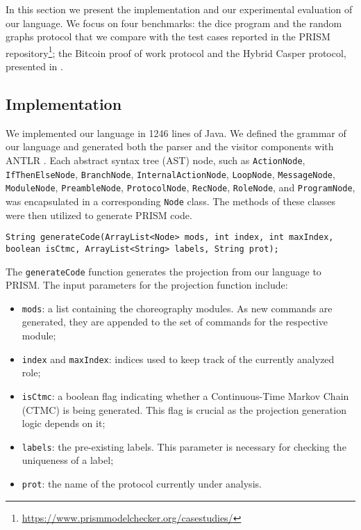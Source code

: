 In this section we present the implementation and our experimental evaluation of our language. 
We focus on four benchmarks: the dice program and the random graphs protocol that we compare with the  
test cases reported in the PRISM repository\footnote{\url{https://www.prismmodelchecker.org/casestudies/}}; 
the Bitcoin proof of work protocol and the Hybrid Casper protocol, 
presented in \cite{DBLP:journals/concurrency/BistarelliNGLMV23,DBLP:journals/distribledger/GallettaLMV23}.
\subsection{Implementation}
We implemented our language in 1246 lines of Java.
We defined the grammar of our language and generated both the parser and the visitor components with ANTLR \cite{ANTLR}.
Each abstract syntax tree (AST) node, such as {\tt ActionNode}, {\tt IfThenElseNode}, {\tt BranchNode}, {\tt InternalActionNode}, {\tt LoopNode}, {\tt MessageNode}, {\tt ModuleNode}, {\tt PreambleNode}, {\tt ProtocolNode}, {\tt RecNode}, {\tt RoleNode}, and {\tt ProgramNode}, was encapsulated in a corresponding {\tt Node} class. The methods of these classes were then utilized to generate PRISM code.
\begin{lstlisting}[language=Eclipse,caption=The \texttt{generateCode} function.,label=genfun1,numbers=none]
	String generateCode(ArrayList<Node> mods, int index, int maxIndex, boolean isCtmc, ArrayList<String> labels, String prot);	
\end{lstlisting}
The {\tt generateCode} function generates the projection from our language to PRISM.
The input parameters for the projection function include:
\begin{itemize}
\item \texttt{mods}: a list containing the choreography modules. As new commands are generated, they are appended to the set of commands for the respective module;
\item \texttt{index} and \texttt{maxIndex}: indices used to keep track of the currently analyzed role;
\item \texttt{isCtmc}: a boolean flag indicating whether a Continuous-Time Markov Chain (CTMC) is being generated. This flag is crucial as the projection generation logic depends on it;
\item \texttt{labels}: the pre-existing labels. This parameter is necessary for checking the uniqueness of a label;
\item \texttt{prot}: the name of the protocol currently under analysis.
\end{itemize}
